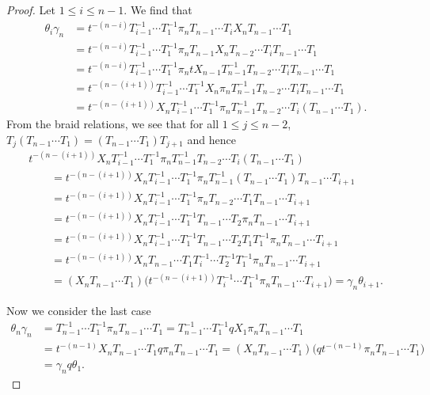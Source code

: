 \documentclass[10pt,a4paper]{amsart}
\numberwithin{equation}{section}
\theoremstyle{definition}
\begin{document}
\begin{proof}
 Let $1 \leq i \leq n-1$. We find that
 \begin{align*}
 \theta_i\gamma_n& = t^{-(n-i)}T_{i-1}^{-1}\cdots T_1^{-1} \pi_n T_{n-1}\cdots T_i X_n T_{n-1}\cdots T_1 \\
 & = t^{-(n-i)}T_{i-1}^{-1}\cdots T_1^{-1} \pi_n T_{n-1}X_n T_{n-2}\cdots T_i T_{n-1} \cdots T_1 \\
 & = t^{-(n-i)}T_{i-1}^{-1}\cdots T_1^{-1}\pi_n tX_{n-1}T_{n-1}^{-1} T_{n-2}\cdots T_i T_{n-1} \cdots T_1 \\
 & = t^{-(n-(i+1))} T_{i-1}^{-1}\cdots T_1^{-1} X_n \pi_n T_{n-1}^{-1} T_{n-2}\cdots T_i T_{n-1}\cdots T_1 \\
 & = t^{-(n-(i+1))} X_n T_{i-1}^{-1}\cdots T_1^{-1} \pi_n T_{n-1}^{-1} T_{n-2}\cdots T_i (T_{n-1}\cdots T_1).
 \end{align*}
 From the braid relations, we see that for all $1\leq j \leq n-2$, $T_j(T_{n-1}\cdots T_1) = (T_{n-1}\cdots T_1)T_{j+1}$
 and hence
 \begin{gather*}
 t^{-(n-(i+1))} X_n T_{i-1}^{-1}\cdots T_1^{-1} \pi_n T_{n-1}^{-1} T_{n-2}\cdots T_i (T_{n-1}\cdots T_1) \\
 \qquad = t^{-(n-(i+1))} X_n T_{i-1}^{-1}\cdots T_1^{-1} \pi_n T_{n-1}^{-1}(T_{n-1}\cdots T_1)T_{n-1}\cdots T_{i+1} \\
 \qquad= t^{-(n-(i+1))} X_n T_{i-1}^{-1}\cdots T_1^{-1} \pi_n T_{n-2} \cdots T_1 T_{n-1}\cdots T_{i+1} \\
 \qquad= t^{-(n-(i+1))} X_n T_{i-1}^{-1}\cdots T_1^{-1} T_{n-1} \cdots T_2 \pi_n T_{n-1}\cdots T_{i+1}\\
 \qquad= t^{-(n-(i+1))} X_n T_{i-1}^{-1}\cdots T_1^{-1} T_{n-1} \cdots T_2 T_1T_1^{-1}\pi_n T_{n-1}\cdots T_{i+1}\\
 \qquad= t^{-(n-(i+1))} X_nT_{n-1} \cdots T_1T_{i}^{-1}\cdots T_2^{-1}T_1^{-1}\pi_n T_{n-1}\cdots T_{i+1}\\
 \qquad= (X_nT_{n-1} \cdots T_1) \bigl(t^{-(n-(i+1))}T_{i}^{-1}\cdots T_1^{-1}\pi_n T_{n-1}\cdots T_{i+1}\bigr)
 = \gamma_n \theta_{i+1}.
 \end{gather*}

 Now we consider the last case
 \begin{align*}
 \theta_n \gamma_n& = T_{n-1}^{-1}\cdots T_1^{-1} \pi_n T_{n-1}\cdots T_1 = T_{n-1}^{-1}\cdots T_1^{-1} qX_1 \pi_n T_{n-1}\cdots T_1 \\
 & = t^{-(n-1)}X_n T_{n-1}\cdots T_1 q\pi_n T_{n-1}\cdots T_1= (X_nT_{n-1} \cdots T_1) \bigl(qt^{-(n-1)}\pi_n T_{n-1}\cdots T_1\bigr) \\
 & = \gamma_n q\theta_1.\tag*{\qed}
 \end{align*} \renewcommand{\qed}{}
\end{proof}
\end{document}
